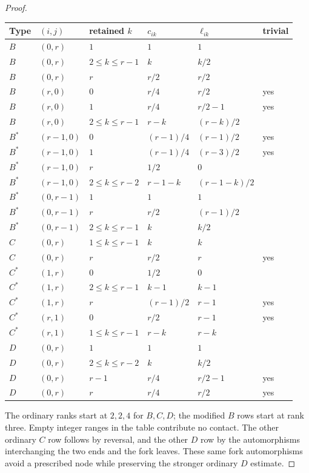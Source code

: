 \documentclass[11pt]{article}
\theoremstyle{remark}\newtheorem{remark}[theorem]{Remark}
\begin{document}
\begin{proof}
{\small
\begin{longtable}{@{}llllll@{}}
\toprule Type&$(i,j)$&retained $k$&$c_{ik}$&$\ell_{ik}$&trivial\\\midrule
\endhead
$B$&$(0,r)$&$1$&$1$&$1$&\\
$B$&$(0,r)$&$2\le k\le r-1$&$k$&$k/2$&\\
$B$&$(0,r)$&$r$&$r/2$&$r/2$&\\
$B$&$(r,0)$&$0$&$r/4$&$r/2$&yes\\
$B$&$(r,0)$&$1$&$r/4$&$r/2-1$&yes\\
$B$&$(r,0)$&$2\le k\le r-1$&$r-k$&$(r-k)/2$&\\
$B^*$&$(r-1,0)$&$0$&$(r-1)/4$&$(r-1)/2$&yes\\
$B^*$&$(r-1,0)$&$1$&$(r-1)/4$&$(r-3)/2$&yes\\
$B^*$&$(r-1,0)$&$r$&$1/2$&$0$&\\
$B^*$&$(r-1,0)$&$2\le k\le r-2$&$r-1-k$&$(r-1-k)/2$&\\
$B^*$&$(0,r-1)$&$1$&$1$&$1$&\\
$B^*$&$(0,r-1)$&$r$&$r/2$&$(r-1)/2$&\\
$B^*$&$(0,r-1)$&$2\le k\le r-1$&$k$&$k/2$&\\
$C$&$(0,r)$&$1\le k\le r-1$&$k$&$k$&\\
$C$&$(0,r)$&$r$&$r/2$&$r$&yes\\
$C^*$&$(1,r)$&$0$&$1/2$&$0$&\\
$C^*$&$(1,r)$&$2\le k\le r-1$&$k-1$&$k-1$&\\
$C^*$&$(1,r)$&$r$&$(r-1)/2$&$r-1$&yes\\
$C^*$&$(r,1)$&$0$&$r/2$&$r-1$&yes\\
$C^*$&$(r,1)$&$1\le k\le r-1$&$r-k$&$r-k$&\\
$D$&$(0,r)$&$1$&$1$&$1$&\\
$D$&$(0,r)$&$2\le k\le r-2$&$k$&$k/2$&\\
$D$&$(0,r)$&$r-1$&$r/4$&$r/2-1$&yes\\
$D$&$(0,r)$&$r$&$r/4$&$r/2$&yes\\
\bottomrule
\end{longtable}}

The ordinary ranks start at $2,2,4$ for $B,C,D$; the modified $B$
rows start at rank three. Empty integer ranges in the table contribute
no contact. The other ordinary $C$ row follows by reversal, and the
other $D$ row by the automorphisms interchanging the two ends and the
fork leaves. These same fork automorphisms avoid a prescribed node
while preserving the stronger ordinary $D$ estimate.


\end{proof}
\end{document}
